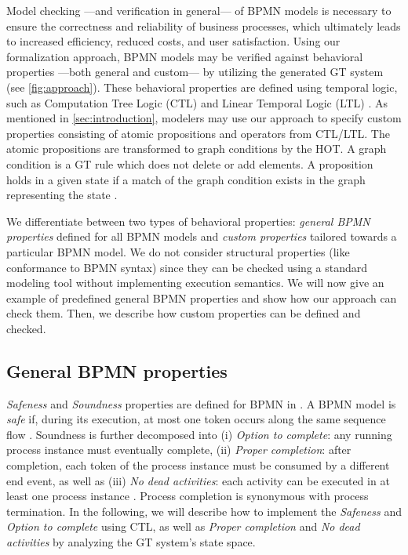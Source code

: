 \documentclass{lmcs} %
\begin{document}
Model checking ---and verification in general--- of BPMN models is necessary to ensure the correctness and reliability of business processes, which ultimately leads to increased efficiency, reduced costs, and user satisfaction.
Using our formalization approach, BPMN models may be verified against behavioral properties ---both general and custom--- by utilizing the generated GT system (see \autoref{fig:approach}).
These behavioral properties are defined using temporal logic, such as Computation Tree Logic (CTL) and Linear Temporal Logic (LTL) \cite{baierPrinciplesModelChecking2008}.
As mentioned in \autoref{sec:introduction}, modelers may use our approach to specify custom properties consisting of atomic propositions and operators from CTL/LTL.
The atomic propositions are transformed to graph conditions by the HOT.
A graph condition is a GT rule which does not delete or add elements.
A proposition holds in a given state if a match of the graph condition exists in the graph representing the state \cite{kastenbergModelCheckingDynamic2006}.

We differentiate between two types of behavioral properties: \textit{general BPMN properties} defined for all BPMN models and \textit{custom properties} tailored towards a particular BPMN model.
We do not consider structural properties (like conformance to BPMN syntax) since they can be checked using a standard modeling tool without implementing execution semantics.
We will now give an example of predefined general BPMN properties and show how our approach can check them.
Then, we describe how custom properties can be defined and checked.

\subsection{General BPMN properties}
\textit{Safeness} and \textit{Soundness} properties are defined for BPMN in \cite{corradiniClassificationBPMNCollaborations2018}.
A BPMN model is \textit{safe} if, during its execution, at most one token occurs along the same sequence flow \cite{corradiniClassificationBPMNCollaborations2018}.
Soundness is further decomposed into (i) \textit{Option to complete}: any running process instance must eventually complete, (ii) \textit{Proper completion}: after completion, each token of the process instance must be consumed by a different end event, as well as (iii) \textit{No dead activities}: each activity can be executed in at least one process instance \cite{corradiniClassificationBPMNCollaborations2018}.
Process completion is synonymous with process termination.
In the following, we will describe how to implement the \textit{Safeness} and \textit{Option to complete} using CTL, as well as \textit{Proper completion} and \textit{No dead activities} by analyzing the GT system's state space.
\end{document}
